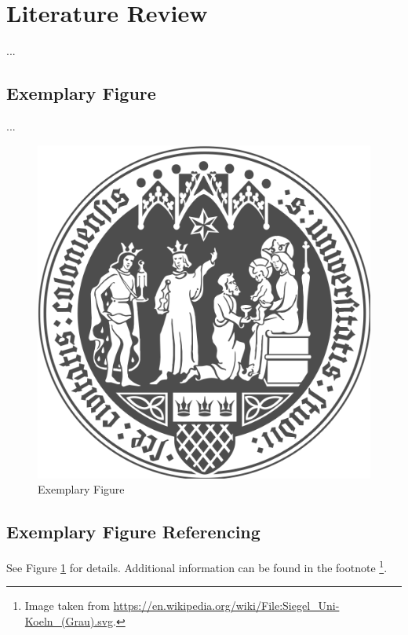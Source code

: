 \clearpage
\section{Literature Review}
\label{sec:lr}
...
\subsection{Exemplary Figure}
\label{subsec:Section_Name/fig}
...
\begin{figure}[htbp]
    \centering
    \includegraphics[width=.5\linewidth]{./Figures/UoC_Logo.png}
    \caption{Exemplary Figure}
    \label{fig:UoC}
\end{figure}


\subsection{Exemplary Figure Referencing}
\label{subsec:Section_Name/fig_rfs}

See Figure \ref{fig:UoC} for details. Additional information can be
found in the footnote \footnote{Image taken from \url{https://en.wikipedia.org/wiki/File:Siegel_Uni-Koeln_(Grau).svg}.}.
